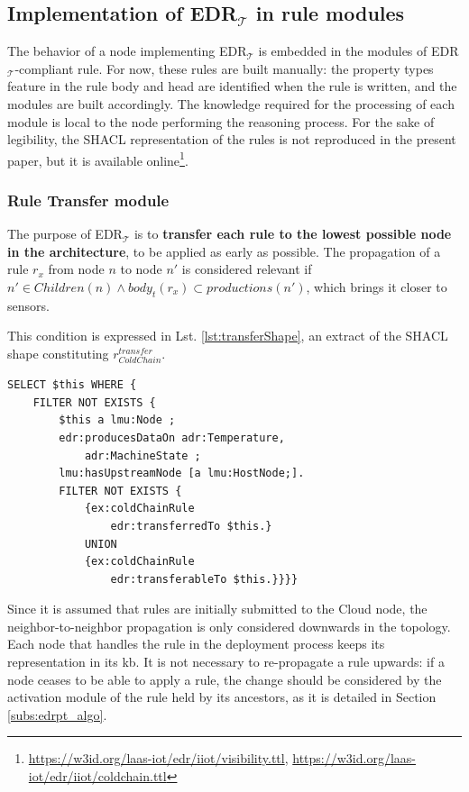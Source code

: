 \documentclass[sw]{iosart2x}
\newcommand{\edrt}{EDR$_{\mathcal{T}}$\xspace}
\begin{document}
\subsection{Implementation of \edrt in rule modules}
\label{subs:edrt_modules}
The behavior of a node implementing \edrt is embedded in the modules of \edrt-compliant rule.
For now, these rules are built manually: the property types feature in the rule body and head are identified when the rule is written, and the modules are built accordingly.
The knowledge required for the processing of each module is local to the node performing the reasoning process. 
For the sake of legibility, the SHACL representation of the rules is not reproduced in the present paper, but it is available online\footnote{\url{https://w3id.org/laas-iot/edr/iiot/visibility.ttl}, \url{https://w3id.org/laas-iot/edr/iiot/coldchain.ttl}}.

\subsubsection{Rule Transfer module}

The purpose of \edrt is to \textbf{transfer each rule to the lowest possible node in the architecture}, to be applied as early as possible. 
The propagation of a rule $r_{x}$ from node $n$ to node $n'$ is considered relevant if $n' \in Children(n) \land body_t(r_{x}) \subset productions(n')$, which brings it closer to sensors. 

This condition is expressed in Lst. \ref{lst:transferShape}, an extract of the SHACL shape constituting $r_{ColdChain}^{transfer}$.
%
\begin{lstlisting}[float, caption=$r_{ColdChain}^{transfer}$ shape, label=lst:transferShape]
SELECT $this WHERE {
	FILTER NOT EXISTS {
		$this a lmu:Node ;
		edr:producesDataOn adr:Temperature,
			adr:MachineState ;
		lmu:hasUpstreamNode [a lmu:HostNode;].
		FILTER NOT EXISTS {
			{ex:coldChainRule 
				edr:transferredTo $this.}
			UNION
			{ex:coldChainRule 
				edr:transferableTo $this.}}}}
\end{lstlisting}

Since it is assumed that rules are initially submitted to the Cloud node, the neighbor-to-neighbor propagation is only considered downwards in the topology.
Each node that handles the rule in the deployment process keeps its representation in its \gls{kb}.
It is not necessary to re-propagate a rule upwards: if a node ceases to be able to apply a rule, the change should be considered by the activation module of the rule held by its ancestors, as it is detailed in Section \textsection \ref{subs:edrpt_algo}.
\end{document}
